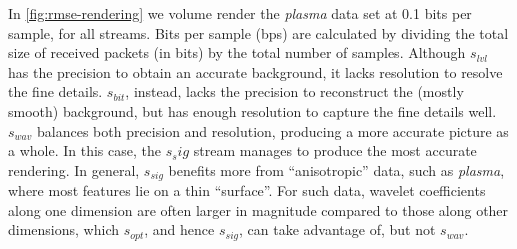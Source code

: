 In \cref{fig:rmse-rendering} we volume render the \emph{plasma} data set at 0.1 bits per sample,
for all streams. Bits per sample (bps) are calculated by dividing the total size of received packets
(in bits) by the total number of samples. Although $s_{lvl}$ has the precision to obtain an accurate
background, it lacks resolution to resolve the fine details. $s_{bit}$, instead, lacks the precision
to reconstruct the (mostly smooth) background, but has enough resolution to capture the fine details
well. $s_{wav}$ balances both precision and resolution, producing a more accurate picture as a
whole. In this case, the $s_sig$ stream manages to produce the most accurate rendering. In general,
$s_{sig}$ benefits more from ``anisotropic'' data, such as \emph{plasma}, where most features lie on
a thin ``surface''. For such data, wavelet coefficients along one dimension are often larger in
magnitude compared to those along other dimensions, which $s_{opt}$, and hence $s_{sig}$, can take
advantage of, but not $s_{wav}$.
